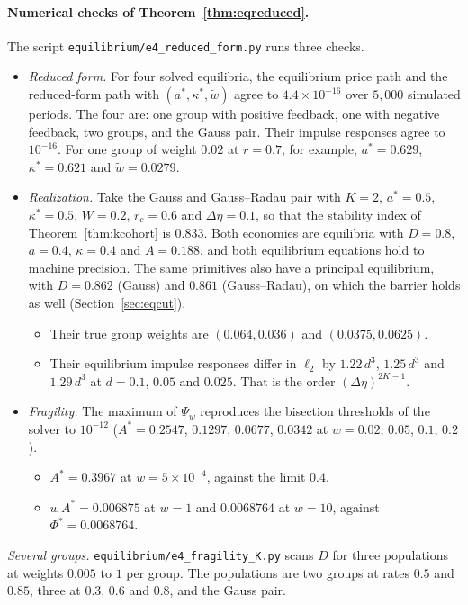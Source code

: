 \documentclass[12pt]{article}
\theoremstyle{definition}
\theoremstyle{remark}
\begin{document}
\paragraph{Numerical checks of Theorem~\ref{thm:eqreduced}.} The script \nolinkurl{equilibrium/e4_reduced_form.py} runs three checks.
\begin{itemize}[itemsep=1pt,topsep=2pt]
\item \emph{Reduced form.} For four solved equilibria, the equilibrium price path and the reduced-form path with $(a^*,\kappa^*,\tilde w)$ agree to $4.4\times10^{-16}$ over $5{,}000$ simulated periods. The four are: one group with positive feedback, one with negative feedback, two groups, and the Gauss pair. Their impulse responses agree to $10^{-16}$. For one group of weight $0.02$ at $r=0.7$, for example, $a^*=0.629$, $\kappa^*=0.621$ and $\tilde w=0.0279$.
\item \emph{Realization.} Take the Gauss and Gauss--Radau pair with $K=2$, $a^*=0.5$, $\kappa^*=0.5$, $W=0.2$, $r_c=0.6$ and $\Delta\eta=0.1$, so that the stability index of Theorem~\ref{thm:kcohort} is $0.833$. Both economies are equilibria with $D=0.8$, $\bar a=0.4$, $\kappa=0.4$ and $A=0.188$, and both equilibrium equations hold to machine precision. The same primitives also have a principal equilibrium, with $D = 0.862$ (Gauss) and $0.861$ (Gauss--Radau), on which the barrier holds as well (Section~\ref{sec:eqcut}).
 \begin{itemize}[itemsep=1pt,topsep=2pt]
 \item Their true group weights are $(0.064,0.036)$ and $(0.0375,0.0625)$.
 \item Their equilibrium impulse responses differ in $\ell_2$ by $1.22\,d^3$, $1.25\,d^3$ and $1.29\,d^3$ at $d=0.1$, $0.05$ and $0.025$. That is the order $(\Delta\eta)^{2K-1}$.
 \end{itemize}
\item \emph{Fragility.} The maximum of $\Psi_w$ reproduces the bisection thresholds of the solver to $10^{-12}$ ($A^*=0.2547$, $0.1297$, $0.0677$, $0.0342$ at $w=0.02$, $0.05$, $0.1$, $0.2$).
 \begin{itemize}[itemsep=1pt,topsep=2pt]
 \item $A^*=0.3967$ at $w=5\times10^{-4}$, against the limit $0.4$.
 \item $w\,A^*=0.006875$ at $w=1$ and $0.0068764$ at $w=10$, against $\Phi^*=0.0068764$.
 \end{itemize}
\end{itemize}
\emph{Several groups.} \nolinkurl{equilibrium/e4_fragility_K.py} scans $D$ for three populations at weights $0.005$ to $1$ per group. The populations are two groups at rates $0.5$ and $0.85$, three at $0.3$, $0.6$ and $0.8$, and the Gauss pair.
\end{document}
